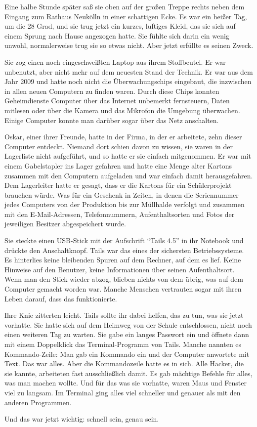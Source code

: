 Eine halbe Stunde später saß sie oben auf der großen Treppe rechts neben dem Eingang zum Rathaus Neukölln in einer schattigen Ecke.
Es war ein heißer Tag, um die 28 Grad, und sie trug jetzt ein kurzes, luftiges Kleid, das sie sich auf einem Sprung nach Hause angezogen hatte.
Sie fühlte sich darin ein wenig unwohl, normalerweise trug sie so etwas nicht.
Aber jetzt erfüllte es seinen Zweck.

Sie zog einen noch eingeschweißten Laptop aus ihrem Stoffbeutel.
Er war unbenutzt, aber nicht mehr auf dem neuesten Stand der Technik.
Er war aus dem Jahr 2009 und hatte noch nicht die Überwachungschips eingebaut, die inzwischen in allen neuen Computern zu finden waren.
Durch diese Chips konnten Geheimdienste Computer über das Internet unbemerkt fernsteuern, Daten mitlesen oder über die Kamera und das Mikrofon die Umgebung überwachen. Einige Computer konnte man darüber sogar über das Netz anschalten.


Oskar, einer ihrer Freunde, hatte in der Firma, in der er arbeitete, zehn dieser Computer entdeckt.
Niemand dort schien davon zu wissen, sie waren in der Lagerliste nicht aufgeführt, und so hatte er sie einfach mitgenommen.
Er war mit einem Gabelstapler ins Lager gefahren und hatte eine Menge alter Kartons zusammen mit den Computern aufgeladen und war einfach damit herausgefahren.
Dem Lagerleiter hatte er gesagt, dass er die Kartons für ein Schülerprojekt brauchen würde.
Was für ein Geschenk in Zeiten, in denen die Seriennummer jedes Computers von der Produktion bis zur Müllhalde verfolgt und zusammen mit den E-Mail-Adressen, Telefonnummern, Aufenthaltsorten und Fotos der jeweiligen Besitzer abgespeichert wurde.

Sie steckte einen USB-Stick mit der Aufschrift \enquote{Tails 4.5} in ihr Notebook und drückte den Anschaltknopf.
Tails war das eines der sichersten Betriebssysteme.
Es hinterlies keine bleibenden Spuren auf dem Rechner, auf dem es lief.
Keine Hinweise auf den Benutzer, keine Informationen über seinen Aufenthaltsort.
Wenn man den Stick wieder abzog, blieben nichts von dem übrig, was auf dem Computer gemacht worden war.
Manche Menschen vertrauten sogar mit ihren Leben darauf, dass das funktionierte.

Ihre Knie zitterten leicht.
Tails sollte ihr dabei helfen, das zu tun, was sie jetzt vorhatte.
Sie hatte sich auf dem Heimweg von der Schule entschlossen, nicht noch einen weiteren Tag zu warten.
Sie gabe ein langes Passwort ein und öffnete dann mit einem Doppelklick das Terminal-Programm von Tails.
Manche nannten es Kommando-Zeile: Man gab ein Kommando ein und der Computer anwortete mit Text.
Das war alles.
Aber die Kommandozeile hatte es in sich.
Alle Hacker, die sie kannte, arbeiteten fast ausschließlich damit.
Es gab mächtige Befehle für alles, was man machen wollte.
Und für das was sie vorhatte, waren Maus und Fenster viel zu langsam.
Im Terminal ging alles viel schneller und genauer als mit den anderen Programmen.

Und das war jetzt wichtig: schnell sein, genau sein.

